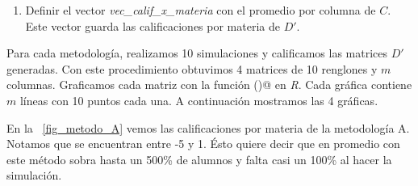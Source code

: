 \begin{enumerate}
                                                                                                                                                                                                                                                                                                                                                                                                                                                                                    
                                                                                                                                                                                                                                                                                                                                                                                                                                                                                    
                                                                                                                                                                                                                                                                                                                                                                                                                                                                                    \item Definir el vector \textit{vec\_calif\_x\_materia} con el promedio por columna de $C$. Este vector guarda las calificaciones por materia de $D'$.
\end{enumerate}

Para cada metodología, realizamos 10 simulaciones y calificamos las matrices $D'$ generadas. Con este procedimiento obtuvimos 4 matrices de 10 renglones y $m$ columnas. Graficamos cada matriz con la función \verb@matplot()@ en \textit{R}. Cada gráfica contiene $m$ líneas con 10 puntos cada una. A continuación mostramos las 4 gráficas.
                                                                                                                                                                                                                                                                                                                                                                                                                                                                                  
                                                                                                                                                                                                                                                                                                                                                                                                                                                                                  En la \figurename{~\ref{fig_metodo_A}} vemos las calificaciones por materia de la metodología A. Notamos que se encuentran entre -5 y 1. Ésto quiere decir que en promedio con este método sobra hasta un 500\% de alumnos y falta casi un 100\% al hacer la simulación.


